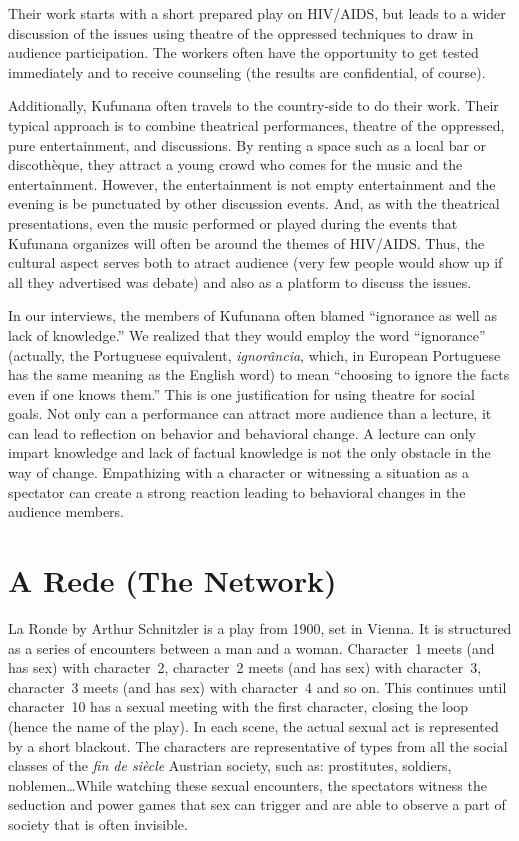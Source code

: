 \documentclass[article,twocolumn]{memoir}
\begin{document}
Their work starts with a short prepared play on HIV/AIDS, but leads to a wider
discussion of the issues using theatre of the oppressed techniques to draw in
audience participation. The workers often have the opportunity to get tested
immediately and to receive counseling (the results are confidential, of
course).

Additionally, Kufunana often travels to the country-side to do their work.
Their typical approach is to combine theatrical performances, theatre of the
oppressed, pure entertainment, and discussions. By renting a space such as a
local bar or discothèque, they attract a young crowd who comes for the music
and the entertainment. However, the entertainment is not empty entertainment
and the evening is be punctuated by other discussion events. And, as with the
theatrical presentations, even the music performed or played during the events
that Kufunana organizes will often be around the themes of HIV/AIDS. Thus, the
cultural aspect serves both to atract audience (very few people would show up
if all they advertised was debate) and also as a platform to discuss the
issues.

In our interviews, the members of Kufunana often blamed ``ignorance as well as
lack of knowledge.'' We realized that they would employ the word ``ignorance''
(actually, the Portuguese equivalent, \textit{ignor\^{a}ncia}, which, in
European Portuguese has the same meaning as the English word) to mean
``choosing to ignore the facts even if one knows them.'' This is one
justification for using theatre for social goals. Not only can a performance
can attract more audience than a lecture, it can lead to reflection on behavior
and behavioral change. A lecture can only impart knowledge and lack of factual
knowledge is not the only obstacle in the way of change.  Empathizing with a
character or witnessing a situation as a spectator can create a strong reaction
leading to behavioral changes in the audience members.

\chapter{A Rede (The Network)}

La Ronde by Arthur Schnitzler is a play from 1900, set in Vienna. It is
structured as a series of encounters between a man and a woman. Character~1
meets (and has sex) with character~2, character~2 meets (and has sex) with
character~3, character~3 meets (and has sex) with character~4 and so on. This
continues until character~10 has a sexual meeting with the first character,
closing the loop (hence the name of the play). In each scene, the actual sexual
act is represented by a short blackout. The characters are representative of
types from all the social classes of the \textit{fin de siècle} Austrian
society, such as: prostitutes, soldiers, noblemen\ldots While watching these
sexual encounters, the spectators witness the seduction and power games that
sex can trigger and are able to observe a part of society that is often
invisible.
\end{document}
